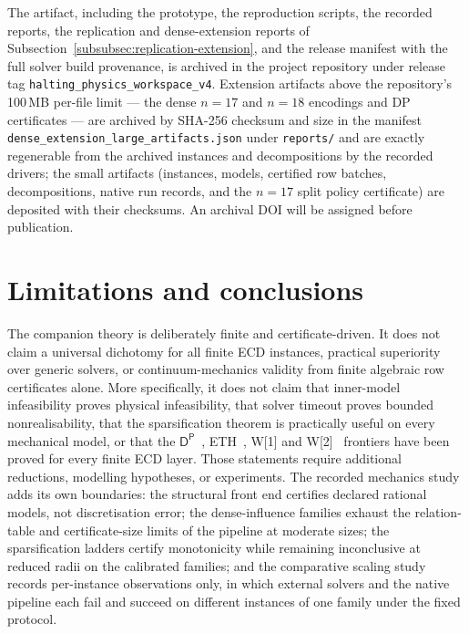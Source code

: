 \documentclass[11pt]{article}
\theoremstyle{plain}
\theoremstyle{definition}
\theoremstyle{remark}
\begin{document}
The artifact, including the prototype, the reproduction scripts, the recorded
reports, the replication and dense-extension reports of
Subsection~\ref{subsubsec:replication-extension}, and the release manifest
with the full solver build provenance, is archived in the project repository
under release tag
\texttt{halting\_\allowbreak physics\_\allowbreak workspace\_\allowbreak v4}.  Extension
artifacts above the repository's 100\,MB per-file limit --- the dense
\(n{=}17\) and \(n{=}18\) encodings and DP certificates --- are archived
by SHA-256 checksum and size in the manifest
\texttt{dense\_\allowbreak extension\_\allowbreak large\_\allowbreak artifacts.json} under \texttt{reports/}
and are exactly
regenerable from the archived instances and decompositions by the recorded
drivers; the small artifacts (instances, models, certified row batches,
decompositions, native run records, and the \(n{=}17\) split policy
certificate) are deposited with their checksums.  An archival DOI will be
assigned before publication.

\section{Limitations and conclusions}
\label{sec:limitations}

The companion theory is deliberately finite and certificate-driven.  It does not
claim a universal dichotomy for all finite ECD instances, practical superiority
over generic solvers, or continuum-mechanics validity from finite algebraic row
certificates alone.  More specifically, it does not claim that inner-model
infeasibility proves physical infeasibility, that solver timeout proves bounded
nonrealisability, that the sparsification theorem is practically useful on every
mechanical model, or that the \(\mathsf
D^{\mathsf P}\)~\cite{papadimitriou94}, ETH~\cite{impagliazzo-paturi01},
W[1] and W[2]~\cite{downey-fellows99}
frontiers have been proved for every finite ECD layer.  Those statements require
additional reductions, modelling hypotheses, or experiments.  The recorded
mechanics study adds its own boundaries: the structural front end certifies
declared rational models, not discretisation error; the dense-influence families
exhaust the relation-table and certificate-size limits of the pipeline at
moderate sizes; the sparsification ladders certify monotonicity while remaining
inconclusive at reduced radii on the calibrated families; and the comparative
scaling study records per-instance observations only, in which external solvers
and the native pipeline each fail and succeed on different instances of one
family under the fixed protocol.
\end{document}
